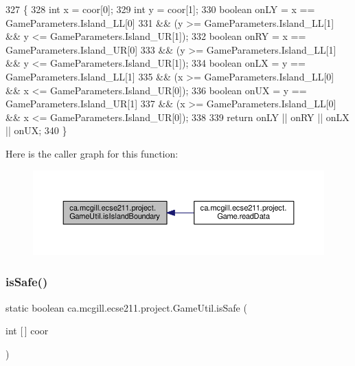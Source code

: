 \begin{DoxyCode}
327                                                      \{
328     \textcolor{keywordtype}{int} x = coor[0];
329     \textcolor{keywordtype}{int} y = coor[1];
330     \textcolor{keywordtype}{boolean} onLY = x == GameParameters.Island\_LL[0]
331         && (y >= GameParameters.Island\_LL[1] && y <= GameParameters.Island\_UR[1]);
332     \textcolor{keywordtype}{boolean} onRY = x == GameParameters.Island\_UR[0]
333         && (y >= GameParameters.Island\_LL[1] && y <= GameParameters.Island\_UR[1]);
334     \textcolor{keywordtype}{boolean} onLX = y == GameParameters.Island\_LL[1]
335         && (x >= GameParameters.Island\_LL[0] && x <= GameParameters.Island\_UR[0]);
336     \textcolor{keywordtype}{boolean} onUX = y == GameParameters.Island\_UR[1]
337         && (x >= GameParameters.Island\_LL[0] && x <= GameParameters.Island\_UR[0]);
338 
339     \textcolor{keywordflow}{return} onLY || onRY || onLX || onUX;
340   \}
\end{DoxyCode}
Here is the caller graph for this function\+:\nopagebreak
\begin{figure}[H]
\begin{center}
\leavevmode
\includegraphics[width=350pt]{classca_1_1mcgill_1_1ecse211_1_1project_1_1_game_util_a5783c3415e13b66362a647504b63741a_icgraph}
\end{center}
\end{figure}
\mbox{\label{classca_1_1mcgill_1_1ecse211_1_1project_1_1_game_util_a4b657445545fb1a814b6699724d72042}} 
\subsubsection{\texorpdfstring{is\+Safe()}{isSafe()}}
{\footnotesize\ttfamily static boolean ca.\+mcgill.\+ecse211.\+project.\+Game\+Util.\+is\+Safe (\begin{DoxyParamCaption}\item[{int \mbox{[}$\,$\mbox{]}}]{coor }\end{DoxyParamCaption})\hspace{0.3cm}{\ttfamily [static]}}

